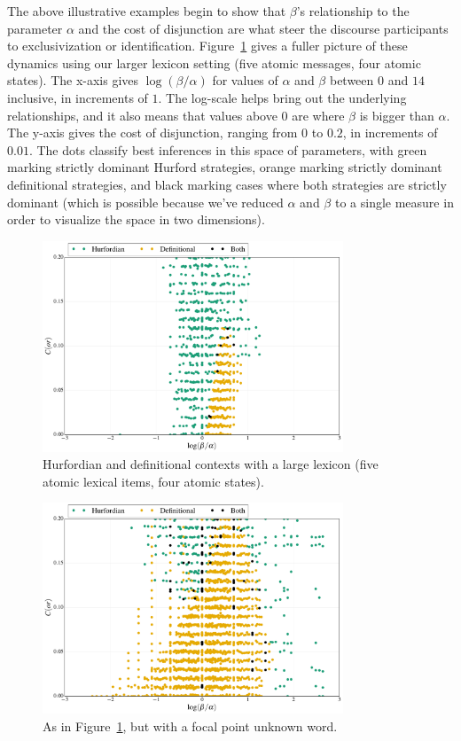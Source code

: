 \documentclass[12pt,twoside]{article}
\newcommand{\Figref}[1]{Figure~\ref{#1}}
\newcommand{\figref}[1]{Figure~\ref{#1}}
\renewcommand{\_}{\textbf{\textunderscore\hspace{-4pt}\textunderscore\hspace{-3pt}\textunderscore\hspace{-4pt}\textunderscore}\hspace{0.5pt}}			%
\begin{document}
The above illustrative examples begin to show that $\beta$'s
relationship to the parameter $\alpha$ and the cost of disjunction are
what steer the discourse participants to exclusivization or
identification. \Figref{fig:char} gives a fuller picture of these
dynamics using our larger lexicon setting (five atomic messages, four
atomic states). The x-axis gives $\log(\beta/\alpha)$ for values of
$\alpha$ and $\beta$ between $0$ and $14$ inclusive, in increments of
$1$. The log-scale helps bring out the underlying relationships, and
it also means that values above $0$ are where $\beta$ is bigger than
$\alpha$. The y-axis gives the cost of disjunction, ranging from $0$
to $0.2$, in increments of $0.01$. The dots classify best inferences in
this space of parameters, with green marking strictly dominant Hurford
strategies, orange marking strictly dominant definitional strategies,
and black marking cases where both strategies are strictly dominant
(which is possible because we've reduced $\alpha$ and $\beta$ to a
single measure in order to visualize the space in two dimensions).

\begin{figure}[tp]
  \centering
  \includegraphics[width=0.8\textwidth]{fig/paramexplore-lex5}
  \caption{Hurfordian and definitional contexts with a large lexicon
    (five atomic lexical items, four atomic states).}
  \label{fig:char}
\end{figure}

\begin{figure}[tp]
  \centering
  \includegraphics[width=0.8\textwidth]{fig/paramexplore-lex5-focal}
  \caption{As in \figref{fig:char}, but with a focal point unknown word.}
  \label{fig:char-focal}
\end{figure}
\end{document}

